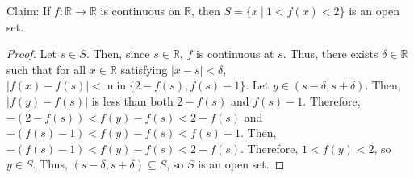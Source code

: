 \documentclass[12pt]{article}
\begin{document}
\newpage
{} Claim: If $f: \mathbb R \to \mathbb R$ is continuous on $\mathbb R$, then $S = \{x~|~1<f(x)<2\}$ is an open set.
\begin{proof}
    Let $s \in S$.
    Then, since $s \in \mathbb R$, $f$ is continuous at $s$.
    Thus, there exists $\delta \in \mathbb R$ such that for all $x \in \mathbb R$ satisfying $|x - s| < \delta$, $|f(x) - f(s)| < \min\{2 - f(s), f(s) - 1\}$.
    Let $y \in (s - \delta, s + \delta)$.
    Then, $|f(y) - f(s)|$ is less than both $2 - f(s)$ and $f(s) - 1$.
    Therefore, $-(2 - f(s)) < f(y) - f(s) < 2 - f(s)$ and $-(f(s) - 1) < f(y) - f(s) < f(s) - 1$.
    Then, $-(f(s) - 1) < f(y) - f(s) < 2 - f(s)$.
    Therefore, $1 < f(y) < 2$, so $y \in S$.
    Thus, $(s - \delta, s + \delta) \subseteq S$, so $S$ is an open set.
\end{proof}
\end{document}
